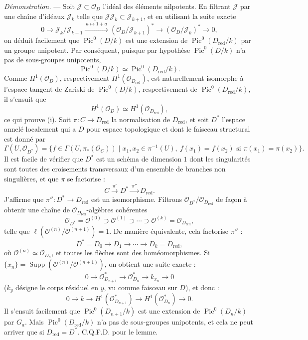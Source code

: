 \documentclass[10pt]{article}
\newcommand{\Pic}{\operatorname{Pic}}
\newcommand{\cO}{\mathcal O}
\begin{document}
\noindent\emph{Démonstration.} --- Soit $\mathcal J\subset \cO_D$ l'idéal des éléments nilpotents. En filtrant $\mathcal J$ par une chaîne d'idéaux $\mathcal J_k$ telle que $\mathcal J\mathcal J_k\subset\mathcal J_{k+1}$, et en utilisant la suite exacte
\[
0\longrightarrow \mathcal J_k/\mathcal J_{k+1}
\xrightarrow{\ a\mapsto 1+a\ }
(\cO_D/\mathcal J_{k+1})^*\longrightarrow (\cO_D/\mathcal J_k)^*\longrightarrow 0,
\]
on déduit facilement que $\Pic^0(D/k)$ est une extension de $\Pic^0(D_{\mathrm{red}}/k)$ par un groupe unipotent. Par conséquent, puisque par hypothèse $\Pic^0(D/k)$ n'a pas de sous-groupes unipotents,
\[
\Pic^0(D/k)\simeq\Pic^0(D_{\mathrm{red}}/k).
\]
Comme $H^1(\cO_D)$, respectivement $H^1(\cO_{D_{\mathrm{red}}})$, est naturellement isomorphe à l'espace tangent de Zariski de $\Pic^0(D/k)$, respectivement de $\Pic^0(D_{\mathrm{red}}/k)$, il s'ensuit que
\[
H^1(\cO_D)\simeq H^1(\cO_{D_{\mathrm{red}}}),
\]
ce qui prouve (i). Soit $\pi:C\to D_{\mathrm{red}}$ la normalisation de $D_{\mathrm{red}}$, et soit $D^*$ l'espace annelé localement qui a $D$ pour espace topologique et dont le faisceau structural est donné par
\[
\Gamma(U,\cO_{D^*})=
\{f\in\Gamma(U,\pi_*(\cO_C))\mid x_1,x_2\in\pi^{-1}(U),\ f(x_1)=f(x_2)\text{ si }\pi(x_1)=\pi(x_2)\}.
\]
Il est facile de vérifier que $D^*$ est un schéma de dimension $1$ dont les singularités sont toutes des croisements transversaux d'un ensemble de branches non singulières, et que $\pi$ se factorise :
\[
C\xrightarrow{\ \pi'\ }D^*\xrightarrow{\ \pi''\ }D_{\mathrm{red}}.
\]
J'affirme que $\pi'':D^*\to D_{\mathrm{red}}$ est un isomorphisme. Filtrons $\cO_{D^*}/\cO_{D_{\mathrm{red}}}$ de façon à obtenir une chaîne de $\cO_{D_{\mathrm{red}}}$-algèbres cohérentes
\[
\cO_{D^*}=\cO^{(0)}\supset \cO^{(1)}\supset\cdots\supset \cO^{(k)}=\cO_{D_{\mathrm{red}}},
\]
telle que $\ell(\cO^{(n)}/\cO^{(n+1)})=1$. De manière équivalente, cela factorise $\pi''$ :
\[
D^*=D_0\longrightarrow D_1\longrightarrow\cdots\longrightarrow D_k=D_{\mathrm{red}},
\]
où $\cO^{(n)}\simeq\cO_{D_n}$, et toutes les flèches sont des homéomorphismes. Si $\{x_n\}=\operatorname{Supp}(\cO^{(n)}/\cO^{(n+1)})$, on obtient une suite exacte :
\[
0\longrightarrow \cO_{D_{n+1}}^*\longrightarrow \cO_{D_n}^*\longrightarrow k_{x_n}\longrightarrow 0
\]
($k_y$ désigne le corps résiduel en $y$, vu comme faisceau sur $D$), et donc :
\[
0\longrightarrow k\longrightarrow H^1(\cO_{D_{n+1}}^*)\longrightarrow H^1(\cO_{D_n}^*)\longrightarrow 0.
\]
Il s'ensuit facilement que $\Pic^0(D_{n+1}/k)$ est une extension de $\Pic^0(D_n/k)$ par $G_a$. Mais $\Pic^0(D_{\mathrm{red}}/k)$ n'a pas de sous-groupes unipotents, et cela ne peut arriver que si $D_{\mathrm{red}}=D^*$. C.Q.F.D. pour le lemme.
\end{document}
